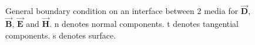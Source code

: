     \begin{figure}[ht]
      \centering
	  \qquad
	  \qquad 
	  \qquad
	  \qquad 
	    \caption[General BC diagrams]{General boundary condition on an interface between 2 media for $\vec{\mathbf{D}}$, $\vec{\mathbf{B}}$, $\vec{\mathbf{E}}$ and $\vec{\mathbf{H}}$. n denotes normal components. t denotes tangential components. s denotes surface.}
	    \label{fig:General BC diagrams}
    \end{figure}

